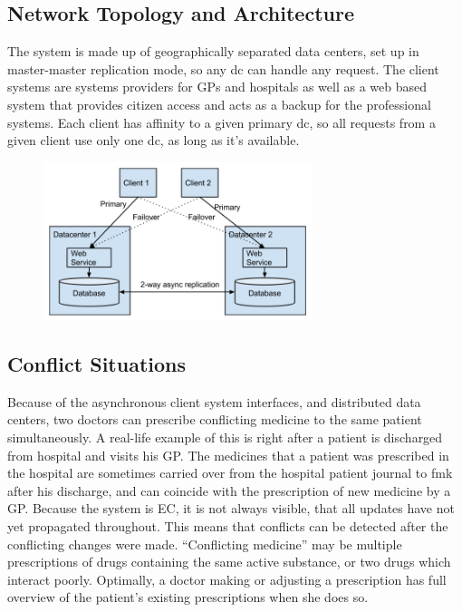 \documentclass[11pt,a4paper]{report}
\begin{document}
\subsection{Network Topology and Architecture}
The system is made up of geographically separated data centers, set up in master-master replication mode, so any \gls{dc} can handle any request.
The client systems are systems providers for GPs and hospitals as well as a web based system that provides citizen access and acts as a backup for the professional systems.
Each client has affinity to a given primary \gls{dc}, so all requests from a given client use only one \gls{dc}, as long as it's available.
\begin{figure}[!h]
	\centering
	\includegraphics[width=0.7\textwidth]{./img/image3.png}
\end{figure}
\subsection{Conflict Situations}
Because of the asynchronous client system interfaces, and distributed data centers, two doctors can prescribe conflicting medicine to the same patient simultaneously. A real-life example of this is right after a patient is discharged from hospital and visits his GP. The medicines that a patient was prescribed in the hospital are sometimes carried over from the hospital patient journal to \gls{fmk} after his discharge, and can coincide with the prescription of new medicine by a GP.
Because the system is EC, it is not always visible, that all updates have not yet propagated throughout. This means that conflicts can be detected after the conflicting changes were made.
``Conflicting medicine'' may be multiple prescriptions of drugs containing the same active substance, or two drugs which interact poorly. Optimally, a doctor making or adjusting a prescription has full overview of the patient's existing prescriptions when she does so.
\end{document}
